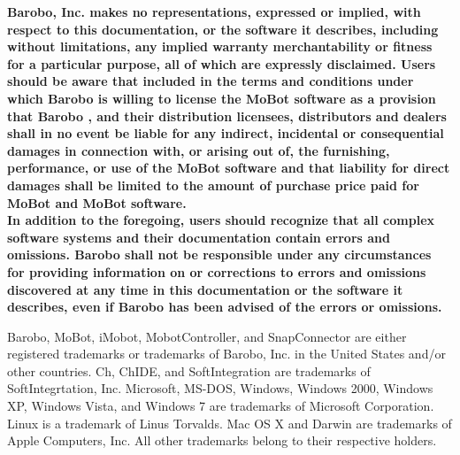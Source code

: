 \noindent
{\bf 
Barobo, Inc.
makes no representations, expressed or implied, with respect
to this documentation, or the software
it describes, including without limitations, any implied
warranty merchantability or fitness for a particular
purpose, all of which are expressly disclaimed.
Users should be aware that included in the terms and conditions
under which  Barobo is willing to license the MoBot software
as a provision that
Barobo , and their distribution
licensees, distributors and dealers shall in no event
be liable for any indirect, incidental or consequential
damages in connection with, 
or arising out of, the furnishing, performance,
or use of the MoBot software
and that liability for direct damages shall be limited
to the amount of purchase price paid for MoBot and MoBot software.\\

\noindent
In addition to the foregoing, users should recognize
that all complex software systems and their documentation
contain errors and omissions. Barobo
shall not be responsible under any circumstances
for providing information on or corrections to errors
and omissions discovered at any time in this documentation
or the software it describes,
even if Barobo has
been advised of the errors or omissions.\\
}


\noindent
Barobo, MoBot, iMobot, MobotController, and SnapConnector
are either
registered trademarks or trademarks of Barobo, Inc.
in the United States and/or other countries.
Ch, ChIDE, and  SoftIntegration 
are trademarks of SoftIntegrtation, Inc.
Microsoft, MS-DOS, Windows, Windows 2000, Windows XP, 
Windows Vista, and Windows 7
are trademarks of Microsoft Corporation.
Linux is a trademark of Linus Torvalds.
Mac OS X and Darwin are trademarks of Apple Computers, Inc.
All other trademarks belong to their respective holders.
